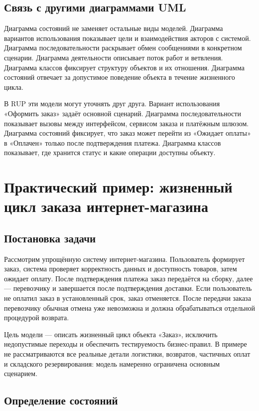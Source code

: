\documentclass[essay,paper]{pmk-graduate}
\begin{document}
\subsection{Связь с другими диаграммами UML}

Диаграмма состояний не заменяет остальные виды моделей. Диаграмма вариантов использования показывает цели и взаимодействия акторов с системой. Диаграмма последовательности раскрывает обмен сообщениями в конкретном сценарии. Диаграмма деятельности описывает поток работ и ветвления. Диаграмма классов фиксирует структуру объектов и их отношения. Диаграмма состояний отвечает за допустимое поведение объекта в течение жизненного цикла.

В RUP эти модели могут уточнять друг друга. Вариант использования «Оформить заказ» задаёт основной сценарий. Диаграмма последовательности показывает вызовы между интерфейсом, сервисом заказа и платёжным шлюзом. Диаграмма состояний фиксирует, что заказ может перейти из «Ожидает оплаты» в «Оплачен» только после подтверждения платежа. Диаграмма классов показывает, где хранится статус и какие операции доступны объекту.

\section{Практический пример: жизненный цикл заказа интернет-магазина}

\subsection{Постановка задачи}

Рассмотрим упрощённую систему интернет-магазина. Пользователь формирует заказ, система проверяет корректность данных и доступность товаров, затем ожидает оплату. После подтверждения платежа заказ передаётся на сборку, далее — перевозчику и завершается после подтверждения доставки. Если пользователь не оплатил заказ в установленный срок, заказ отменяется. После передачи заказа перевозчику обычная отмена уже невозможна и должна обрабатываться отдельной процедурой возврата.

Цель модели — описать жизненный цикл объекта «Заказ», исключить недопустимые переходы и обеспечить тестируемость бизнес-правил. В примере не рассматриваются все реальные детали логистики, возвратов, частичных оплат и складского резервирования: модель намеренно ограничена основным сценарием.

\subsection{Определение состояний}
\end{document}
